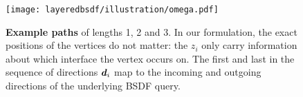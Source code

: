 \begin{figure}[!ht]
	\centering
	\texttt{[image: layeredbsdf/illustration/omega.pdf]}
	\caption[Example paths]{\label{fig:layeredbsdf:paths}
		\textbf{Example paths} of lengths 1, 2 and 3.
		In our formulation, the exact positions of the vertices do not matter: the $z_i$ only carry information about which interface the vertex occurs on.
		The first and last in the sequence of directions $\bm{d}_i$ map to the incoming and outgoing directions of the underlying BSDF query.
	}
\end{figure}